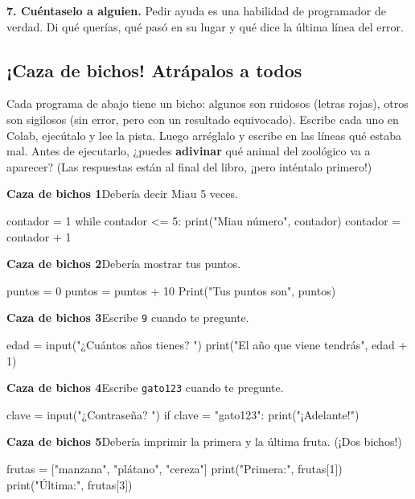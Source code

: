 \textbf{7. Cuéntaselo a alguien.} Pedir ayuda es una habilidad de programador de verdad. Di qué querías, qué pasó en su lugar y qué dice la última línea del error.


\clearpage
\subsection*{¡Caza de bichos! Atrápalos a todos}

Cada programa de abajo tiene un bicho: algunos son ruidosos (letras rojas), otros son sigilosos (sin error, pero con un resultado equivocado). Escribe cada uno en Colab, ejecútalo y lee la pista. Luego arréglalo y escribe en las líneas qué estaba mal. Antes de ejecutarlo, ¿puedes \textbf{adivinar} qué animal del zoológico va a aparecer? (Las respuestas están al final del libro, ¡pero inténtalo primero!)

\newcommand{\bzhunt}[2]{\par{}\smallskip\textbf{Caza de bichos #1}\quad #2\par\nopagebreak}

\bzhunt{1}{Debería decir Miau 5 veces.}
\begin{code}
contador = 1
while contador <= 5:
print("Miau número", contador)
    contador = contador + 1
\end{code}
\bzruled

\bzhunt{2}{Debería mostrar tus puntos.}
\begin{code}
puntos = 0
puntos = puntos + 10
Print("Tus puntos son", puntos)
\end{code}
\bzruled

\bzhunt{3}{Escribe \texttt{9} cuando te pregunte.}
\begin{code}
edad = input("¿Cuántos años tienes? ")
print("El año que viene tendrás", edad + 1)
\end{code}
\bzruled

\bzhunt{4}{Escribe \texttt{gato123} cuando te pregunte.}
\begin{code}
clave = input("¿Contraseña? ")
if clave = "gato123":
    print("¡Adelante!")
\end{code}
\bzruled

\bzhunt{5}{Debería imprimir la primera y la última fruta. (¡Dos bichos!)}
\begin{code}
frutas = ["manzana", "plátano", "cereza"]
print("Primera:", frutas[1])
print("Última:", frutas[3])
\end{code}
\bzruled

